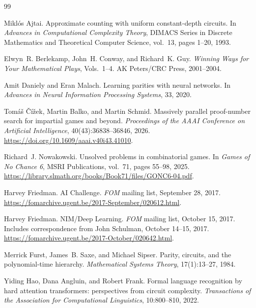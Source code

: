 \documentclass[11pt]{article}
\theoremstyle{plain}
\theoremstyle{definition}
\theoremstyle{remark}
\numberwithin{equation}{section}
\begin{document}
\begin{thebibliography}{99}

Mikl{\'o}s Ajtai.
\newblock Approximate counting with uniform constant-depth circuits.
\newblock In \emph{Advances in Computational Complexity Theory}, DIMACS Series in Discrete Mathematics and Theoretical Computer Science, vol.~13, pages 1--20, 1993.

Elwyn~R. Berlekamp, John~H. Conway, and Richard~K. Guy.
\newblock \emph{Winning Ways for Your Mathematical Plays}, Vols.~1--4.
\newblock AK Peters/CRC Press, 2001--2004.

Amit Daniely and Eran Malach.
\newblock Learning parities with neural networks.
\newblock In \emph{Advances in Neural Information Processing Systems}, 33, 2020.

Tom{\'a}\v{s} \v{C}{\'i}\v{z}ek, Martin Balko, and Martin Schmid.
\newblock Massively parallel proof-number search for impartial games and beyond.
\newblock \emph{Proceedings of the AAAI Conference on Artificial Intelligence}, 40(43):36838--36846, 2026.
\newblock \url{https://doi.org/10.1609/aaai.v40i43.41010}.

Richard~J. Nowakowski.
\newblock Unsolved problems in combinatorial games.
\newblock In \emph{Games of No Chance 6}, MSRI Publications, vol.~71, pages 55--98, 2025.
\newblock \url{https://library.slmath.org/books/Book71/files/GONC6-04.pdf}.



Harvey Friedman.
\newblock AI Challenge.
\newblock \emph{FOM} mailing list, September 28, 2017.
\newblock \url{https://fomarchive.ugent.be/2017-September/020612.html}.

Harvey Friedman.
\newblock NIM/Deep Learning.
\newblock \emph{FOM} mailing list, October 15, 2017.
\newblock Includes correspondence from John Schulman, October 14--15, 2017.
\newblock \url{https://fomarchive.ugent.be/2017-October/020642.html}.

Merrick Furst, James~B. Saxe, and Michael Sipser.
\newblock Parity, circuits, and the polynomial-time hierarchy.
\newblock \emph{Mathematical Systems Theory}, 17(1):13--27, 1984.

Yiding Hao, Dana Angluin, and Robert Frank.
\newblock Formal language recognition by hard attention transformers:
perspectives from circuit complexity.
\newblock \emph{Transactions of the Association for Computational Linguistics},
10:800--810, 2022.


\end{thebibliography}
\end{document}
